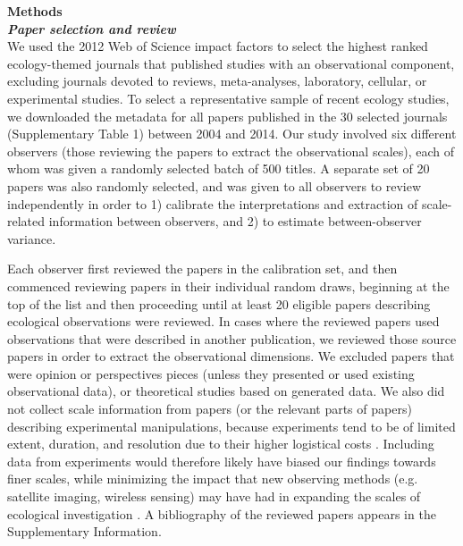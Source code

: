 \documentclass[12pt]{article}
\begin{document}
\vspace{10pt}
\noindent \textbf{Methods}
\vspace{5pt}
\\
\noindent \textbf{\emph{Paper selection and review}}\\
We used the 2012 Web of Science impact factors to select the highest ranked ecology-themed journals that published studies with an observational component, excluding journals devoted to reviews, meta-analyses, laboratory, cellular, or experimental studies.  To select a representative sample of recent ecology studies, we downloaded the metadata for all papers published in the 30 selected journals (Supplementary Table 1) between 2004 and 2014. Our study involved six different observers (those reviewing the papers to extract the observational scales), each of whom was given a randomly selected batch of 500 titles.  A separate set of 20 papers was also randomly selected, and was given to all observers to review independently in order to 1) calibrate the interpretations and extraction of scale-related information between observers, and 2) to estimate between-observer variance.  

Each observer first reviewed the papers in the calibration set, and then commenced reviewing papers in their individual random draws, beginning at the top of the list and then proceeding until at least 20 eligible papers describing ecological observations were reviewed. In cases where the reviewed papers used observations that were described in another publication, we reviewed those source papers in order to extract the observational dimensions. We excluded papers that were opinion or perspectives pieces (unless they presented or used existing observational data), or theoretical studies based on generated data. We also did not collect scale information from papers (or the relevant parts of papers) describing experimental manipulations, because experiments tend to be of limited extent, duration, and resolution due to their higher logistical costs \cite{tilman_ecological_1989, kareiva_spatial_1988}. Including data from experiments would therefore likely have biased our findings towards finer scales, while minimizing the impact that new observing methods (e.g. satellite imaging, wireless sensing) may have had in expanding the scales of ecological investigation \cite{turner_remote_2003,pettorelli_satellite_2014,porter_wireless_2005}. A bibliography of the reviewed papers appears in the Supplementary Information. 
\end{document}
